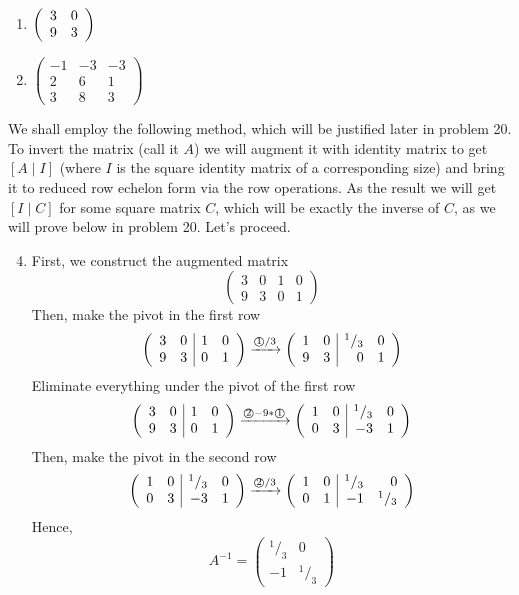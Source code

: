 \documentclass[8pt]{article} %
\newcommand{\myexplain}[3]{#1\xrightarrow{\text{#2}}#3}
\newcommand{\myfrac}[2]{^#1/_#2}
\begin{document}
\begin{description}
{{\begin{enumerate}[label=(\alph*)]
			\item $\mymat{3&0\\9&3}$
			\setcounter{enumi}{6}
			\renewcommand{\mymat}[1]{\left(\begin{array}{rrr}#1\end{array}\right)}
			\item $\mymat{-1&-3&-3\\2&6&1\\3&8&3}$
		\end{enumerate}
			}
		We shall employ the following method, which will be justified later in problem 20. To invert the matrix (call it $A$) we
		will augment it with identity matrix to get $\left[A\mid I\right]$ (where $I$ is the square identity matrix of a
		corresponding size) and bring it to reduced row echelon form via the row operations. As the result we will get
		$\left[I\mid C\right]$ for some square matrix $C$, which will be exactly the inverse of $C$, as we will prove below in
		problem 20. Let's proceed.
		\begin{enumerate}[label=(\alph*)]
			\setcounter{enumi}{3}
			\renewcommand{\mymat}[1]{\left(\begin{array}{rr|rr}#1\end{array}\right)}
			\item First, we construct the augmented matrix
				\[\mymat{3&0&1&0\\9&3&0&1}\]
			Then, make the pivot in the first row
			\[\myexplain
				{\mymat{3&0&1&0\\9&3&0&1}}
				{\textcircled{1}$/3$}
				{\mymat{1&0&\myfrac{1}{3}&0\\9&3&0&1}}
			\]
			Eliminate everything under the pivot of the first row
			\[\myexplain
				{\mymat{3&0&1&0\\9&3&0&1}}
				{\textcircled{2}$-9*$\textcircled{1}}
				{\mymat{1&0&\myfrac{1}{3}&0\\0&3&-3&1}}
			\]
			Then, make the pivot in the second row
			\[\myexplain
				{\mymat{1&0&\myfrac{1}{3}&0\\0&3&-3&1}}
				{\textcircled{2}$/3$}
				{\mymat{1&0&\myfrac{1}{3}&0\\0&1&-1&\myfrac{1}{3}}}
			\]
			Hence, \[A^{-1}=\left(\begin{array}{rr}\myfrac{1}{3}&0\\-1&\myfrac{1}{3}\end{array}\right)\]
			\setcounter{enumi}{6}
			\renewcommand{\mymat}[1]{\left(\begin{array}{rrr|rrr}#1\end{array}\right)}

\end{enumerate}}
\end{description}
\end{document}
